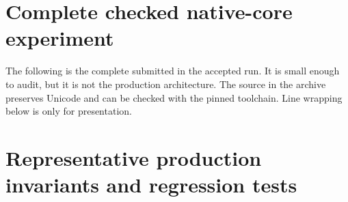 \clearpage
\section{Complete checked native-core experiment}
\label{app:core}
The following is the complete  submitted in the accepted run. It is small enough to audit, but it is not the production architecture. The source in the archive preserves Unicode and can be checked with the pinned toolchain. Line wrapping below is only for presentation.


\clearpage
\section{Representative production invariants and regression tests}
\label{app:invariants}
